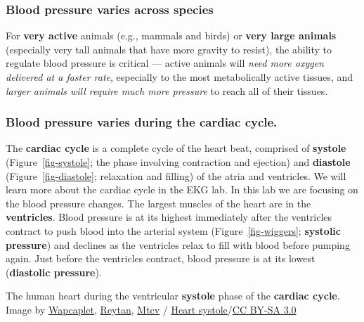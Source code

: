 \documentclass[
  letterpaper,
  DIV=11,
  numbers=noendperiod,
  oneside]{scrartcl}
\begin{document}
\hypertarget{blood-pressure-varies-across-species}{%
\subsubsection{Blood pressure varies across
species}\label{blood-pressure-varies-across-species}}

For \textbf{very active} animals (e.g., mammals and birds) or
\textbf{very large animals} (especially very tall animals that have more
gravity to resist), the ability to regulate blood pressure is critical
--- active animals will \emph{need more oxygen delivered at a faster
rate}, especially to the most metabolically active tissues, and
\emph{larger animals will require much more pressure} to reach all of
their tissues.

\hypertarget{blood-pressure-varies-during-the-cardiac-cycle.}{%
\subsubsection{Blood pressure varies during the cardiac
cycle.}\label{blood-pressure-varies-during-the-cardiac-cycle.}}

The \textbf{cardiac cycle} is a complete cycle of the heart beat,
comprised of \textbf{systole} (Figure~\ref{fig-systole}; the phase
involving contraction and ejection) and \textbf{diastole}
(Figure~\ref{fig-diastole}; relaxation and filling) of the atria and
ventricles. We will learn more about the cardiac cycle in the EKG lab.
In this lab we are focusing on the blood pressure changes. The largest
muscles of the heart are in the \textbf{ventricles}. Blood pressure is
at its highest immediately after the ventricles contract to push blood
into the arterial system (Figure~\ref{fig-wiggers}; \textbf{systolic
pressure}) and declines as the ventricles relax to fill with blood
before pumping again. Just before the ventricles contract, blood
pressure is at its lowest (\textbf{diastolic pressure}).

\begin{marginfigure}

{\centering 

}

\caption{\label{fig-systole}The human heart during the ventricular
\textbf{systole} phase of the \textbf{cardiac cycle}. Image by
\href{href=\%22https://en.wikipedia.org/wiki/User:Wapcaplet}{Wapcaplet},
\href{https://commons.wikimedia.org/wiki/User:Reytan}{Reytan},
\href{https://commons.wikimedia.org/wiki/User:Mtcv}{Mtcv} /
\href{https://commons.wikimedia.org/wiki/File:Heart_systole.svg}{Heart
systole}/\href{https://creativecommons.org/licenses/by-sa/3.0/}{CC BY-SA
3.0}}

\end{marginfigure}
\end{document}

